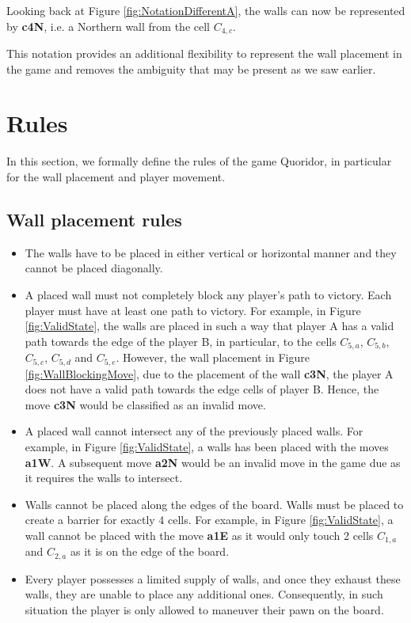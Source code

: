 Looking back at Figure \ref{fig:NotationDifferentA}, the walls can now be represented by \textbf{c4N}, i.e. a Northern wall from the cell $C_{4, c}$.

This notation provides an additional flexibility to represent the wall placement in the game and removes the ambiguity that may be present as we saw earlier.

\section {Rules}
In this section, we formally define the rules of the game Quoridor, in particular for the wall placement and player movement.

\subsection{Wall placement rules}
\label{WallRules}

\begin{itemize}
    \item The walls have to be placed in either vertical or horizontal manner and they cannot be placed diagonally.
    \item A placed wall must not completely block any player's path to victory. Each player must have at least
        one path to victory. For example, in Figure \ref{fig:ValidState}, the walls are placed in such a way that player A has a valid path towards the edge of the player B, in particular, to the cells $C_{5, a}$, $C_{5, b}$, $C_{5, c}$, $C_{5, d}$ and $C_{5, e}$. However, the wall placement in Figure \ref{fig:WallBlockingMove}, due to the placement of the wall \textbf{c3N}, the player A does not have a valid path towards the edge cells of player B. Hence, the move \textbf{c3N} would be classified as an invalid move.
    \item A placed wall cannot intersect any of the previously placed walls. For example, in Figure \ref{fig:ValidState}, a walls has been placed with the moves \textbf{a1W}. A subsequent move \textbf{a2N} would be an invalid move in the game due as it requires the walls to intersect.
    \item Walls cannot be placed along the edges of the board. Walls must be placed to create a barrier for exactly 4 cells. For example, in Figure \ref{fig:ValidState}, a wall cannot be placed with the move \textbf{a1E} as it would only touch 2 cells $C_{1, a}$ and $C_{2, a}$ as it is on the edge of the board.
    \item  Every player possesses a limited supply of walls, and once they exhaust these walls, they are unable to place any additional ones. Consequently, in such situation the player is only allowed to maneuver their pawn on the
        board.
\end{itemize}

